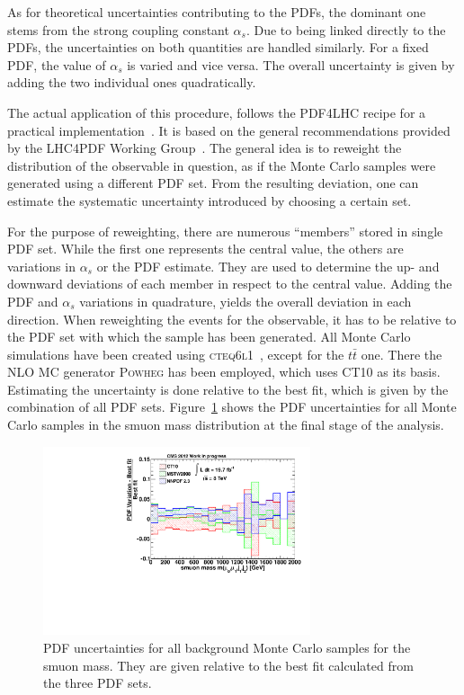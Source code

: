 As for theoretical uncertainties contributing to the PDFs, the dominant one stems from the strong coupling constant $\alpha_s$. Due to being linked directly to the PDFs, the uncertainties on both quantities are handled similarly. For a fixed PDF, the value of $\alpha_s$ is varied and vice versa. The overall uncertainty is given by adding the two individual ones quadratically.

The actual application of this procedure, follows the \textsc{PDF4LHC} recipe for a practical implementation~\cite{pdf4lhcpractical}. It is based on the general recommendations provided by the LHC4PDF Working Group~\cite{pdf4lhcrecom}. The general idea is to reweight the distribution of the observable in question, as if the Monte Carlo samples were generated using a different PDF set. From the resulting deviation, one can estimate the systematic uncertainty introduced by choosing a certain set.

For the purpose of reweighting, there are numerous ``members'' stored in single PDF set. While the first one represents the central value, the others are variations in $\alpha_s$ or the PDF estimate. They are used to determine the up- and downward deviations of each member in respect to the central value. Adding the PDF and $\alpha_s$ variations in quadrature, yields the overall deviation in each direction. When reweighting the events for the observable, it has to be relative to the PDF set with which the sample has been generated. All Monte Carlo simulations have been created using \textsc{cteq6l1}~\cite{cteq6l1}, except for the $t\bar{t}$ one. There the NLO MC generator \textsc{Powheg} has been employed, which uses \textsc{CT10} as its basis. Estimating the uncertainty is done relative to the best fit, which is given by the combination of all PDF sets. Figure~\ref{fig:pdfsys} shows the PDF uncertainties for all Monte Carlo samples in the smuon mass distribution at the final stage of the analysis.

\begin{figure}[!htb]
  \centering
  \includegraphics[width=0.7\textwidth]{plots/pdfratios.pdf}
  \caption{PDF uncertainties for all background Monte Carlo samples for the smuon mass. They are given relative to the best fit calculated from the three PDF sets.}
  \label{fig:pdfsys}
\end{figure}

